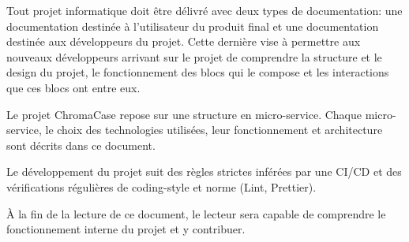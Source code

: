 Tout projet informatique doit être délivré avec deux types de documentation: une documentation destinée à l’utilisateur du produit final et une documentation destinée aux développeurs du projet. Cette dernière vise à permettre aux nouveaux développeurs arrivant sur le projet de comprendre la structure et le design du projet, le fonctionnement des blocs qui le compose et les interactions que ces blocs ont entre eux.

Le projet ChromaCase repose sur une structure en micro-service. Chaque micro-service, le choix des technologies utilisées, leur fonctionnement et architecture sont décrits dans ce document.

Le développement du projet suit des règles strictes inférées par une CI/CD et des vérifications régulières de coding-style et norme (Lint, Prettier).

À la fin de la lecture de ce document, le lecteur sera capable de comprendre le fonctionnement interne du projet et y contribuer.